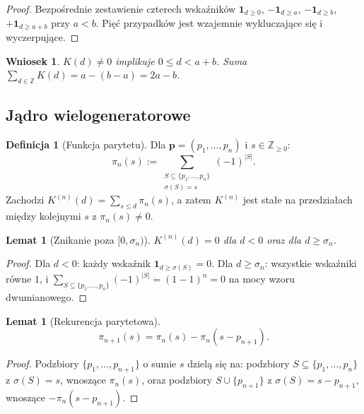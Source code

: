 \documentclass[11pt,a4paper]{amsart}
\theoremstyle{plain}
\newtheorem{lemma}[theorem]{Lemat}
\newtheorem{corollary}[theorem]{Wniosek}
\theoremstyle{definition}
\newtheorem{definition}[theorem]{Definicja}
\theoremstyle{remark}
\begin{document}
\begin{proof}
Bezpośrednie zestawienie czterech wskaźników $\mathbf{1}_{d \geq 0}$,
$-\mathbf{1}_{d \geq a}$, $-\mathbf{1}_{d \geq b}$,
$+\mathbf{1}_{d \geq a+b}$ przy $a < b$.
Pięć przypadków jest wzajemnie wykluczające się i wyczerpujące.
\end{proof}

\begin{corollary}
\label{cor:support}
$K(d) \neq 0$ implikuje $0 \leq d < a+b$.
Suma $\sum_{d \in \mathbb{Z}} K(d) = a - (b - a) = 2a - b$.
\end{corollary}

\subsection*{Jądro wielogeneratorowe}

\begin{definition}[Funkcja parytetu]
\label{def:parity}
Dla $\mathbf{p} = (p_1,\ldots,p_n)$ i $s \in \mathbb{Z}_{\geq 0}$:
\[
  \pi_n(s) := \sum_{\substack{S \subseteq \{p_1,\ldots,p_n\} \\
                              \sigma(S) = s}} (-1)^{|S|}.
\]
Zachodzi $K^{(n)}(d) = \sum_{s \leq d} \pi_n(s)$,
a zatem $K^{(n)}$ jest stałe na przedziałach między kolejnymi
$s$ z $\pi_n(s) \neq 0$.
\end{definition}

\begin{lemma}[Znikanie poza $[0, \sigma_n)$]
\label{lem:K-vanish}
$K^{(n)}(d) = 0$ dla $d < 0$ oraz dla $d \geq \sigma_n$.
\end{lemma}

\begin{proof}
Dla $d < 0$: każdy wskaźnik $\mathbf{1}_{d \geq \sigma(S)} = 0$.
Dla $d \geq \sigma_n$: wszystkie wskaźniki równe $1$, i
$\sum_{S \subseteq \{p_1,\ldots,p_n\}} (-1)^{|S|} = (1-1)^n = 0$
na mocy wzoru dwumianowego.
\end{proof}

\begin{lemma}[Rekurencja parytetowa]
\label{lem:parity-recurrence}
\[
  \pi_{n+1}(s) = \pi_n(s) - \pi_n(s - p_{n+1}).
\]
\end{lemma}

\begin{proof}
Podzbiory $\{p_1,\ldots,p_{n+1}\}$ o sumie $s$ dzielą się na:
podzbiory $S \subseteq \{p_1,\ldots,p_n\}$ z $\sigma(S) = s$,
wnoszące $\pi_n(s)$, oraz podzbiory $S \cup \{p_{n+1}\}$
z $\sigma(S) = s - p_{n+1}$, wnoszące $-\pi_n(s - p_{n+1})$.
\end{proof}
\end{document}
